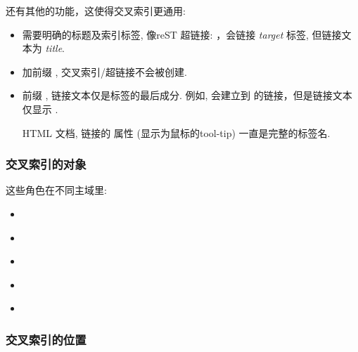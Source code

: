 \documentclass[letterpaper,10pt,english]{sphinxmanual}
\begin{document}
还有其他的功能，这使得交叉索引更通用:
\begin{itemize}
\item {} 
需要明确的标题及索引标签, 像reST 超链接:  ，会链接 \emph{target} 标签, 但链接文本为 \emph{title}.

\item {} 
加前缀 \code{!}, 交叉索引/超链接不会被创建.

\item {} 
前缀 \code{\textasciitilde{}}, 链接文本仅是标签的最后成分.
例如,  会建立到  的链接，但是链接文本仅显示  .

HTML 文档, 链接的  属性 (显示为鼠标的tool-tip) 一直是完整的标签名.

\end{itemize}


\subsubsection{交叉索引的对象}
\label{markup/inline:id5}
这些角色在不同主域里:
\begin{itemize}
\item {} 
{\hyperref[domains:python\string-roles]{}}

\item {} 
{\hyperref[domains:c\string-roles]{}}

\item {} 
{\hyperref[domains:cpp\string-roles]{}}

\item {} 
{\hyperref[domains:js\string-roles]{}}

\item {} 
{\hyperref[domains:rst\string-roles]{}}

\end{itemize}


\subsubsection{交叉索引的位置}
\label{markup/inline:ref-role}\label{markup/inline:id6}
\end{document}
